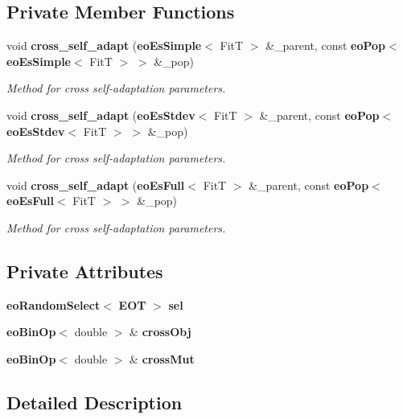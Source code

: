 \subsection*{Private Member Functions}
\begin{CompactItemize}
\item 
void {\bf cross\_\-self\_\-adapt} ({\bf eo\-Es\-Simple}$<$ Fit\-T $>$ \&\_\-parent, const {\bf eo\-Pop}$<$ {\bf eo\-Es\-Simple}$<$ Fit\-T $>$ $>$ \&\_\-pop)
\begin{CompactList}\small\item\em Method for cross self-adaptation parameters. \item\end{CompactList}\item 
void {\bf cross\_\-self\_\-adapt} ({\bf eo\-Es\-Stdev}$<$ Fit\-T $>$ \&\_\-parent, const {\bf eo\-Pop}$<$ {\bf eo\-Es\-Stdev}$<$ Fit\-T $>$ $>$ \&\_\-pop)
\begin{CompactList}\small\item\em Method for cross self-adaptation parameters. \item\end{CompactList}\item 
void {\bf cross\_\-self\_\-adapt} ({\bf eo\-Es\-Full}$<$ Fit\-T $>$ \&\_\-parent, const {\bf eo\-Pop}$<$ {\bf eo\-Es\-Full}$<$ Fit\-T $>$ $>$ \&\_\-pop)
\begin{CompactList}\small\item\em Method for cross self-adaptation parameters. \item\end{CompactList}\end{CompactItemize}
\subsection*{Private Attributes}
\begin{CompactItemize}
\item 
{\bf eo\-Random\-Select}$<$ {\bf EOT} $>$ {\bf sel}\label{classeo_es_global_xover_r0}

\item 
{\bf eo\-Bin\-Op}$<$ double $>$ \& {\bf cross\-Obj}\label{classeo_es_global_xover_r1}

\item 
{\bf eo\-Bin\-Op}$<$ double $>$ \& {\bf cross\-Mut}\label{classeo_es_global_xover_r2}

\end{CompactItemize}


\subsection{Detailed Description}
